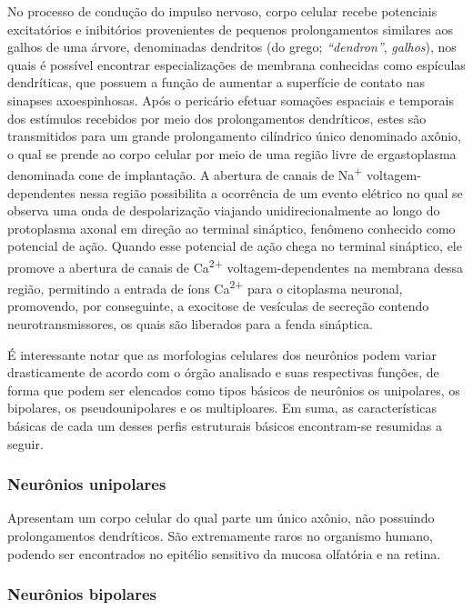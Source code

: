 \documentclass[
]{book}
\theoremstyle{definition}
\theoremstyle{definition}
\theoremstyle{definition}
\theoremstyle{definition}
\theoremstyle{remark}
\begin{document}
No processo de condução do impulso nervoso, corpo celular recebe potenciais excitatórios e inibitórios provenientes de pequenos prolongamentos similares aos galhos de uma árvore, denominadas dendritos (do grego; \emph{``dendron''}, \emph{galhos}), nos quais é possível encontrar especializações de membrana conhecidas como espículas dendríticas, que possuem a função de aumentar a superfície de contato nas sinapses axoespinhosas. Após o pericário efetuar somações espaciais e temporais dos estímulos recebidos por meio dos prolongamentos dendríticos, estes são transmitidos para um grande prolongamento cilíndrico único denominado axônio, o qual se prende ao corpo celular por meio de uma região livre de ergastoplasma denominada cone de implantação. A abertura de canais de Na\textsuperscript{+} voltagem-dependentes nessa região possibilita a ocorrência de um evento elétrico no qual se observa uma onda de despolarização viajando unidirecionalmente ao longo do protoplasma axonal em direção ao terminal sináptico, fenômeno conhecido como potencial de ação. Quando esse potencial de ação chega no terminal sináptico, ele promove a abertura de canais de Ca\textsuperscript{2+} voltagem-dependentes na membrana dessa região, permitindo a entrada de íons Ca\textsuperscript{2+} para o citoplasma neuronal, promovendo, por conseguinte, a exocitose de vesículas de secreção contendo neurotransmissores, os quais são liberados para a fenda sináptica.

É interessante notar que as morfologias celulares dos neurônios podem variar drasticamente de acordo com o órgão analisado e suas respectivas funções, de forma que podem ser elencados como tipos básicos de neurônios os unipolares, os bipolares, os pseudounipolares e os multiploares. Em suma, as características básicas de cada um desses perfis estruturais básicos encontram-se resumidas a seguir.

\hypertarget{neuruxf4nios-unipolares}{%
\subsubsection*{Neurônios unipolares}\label{neuruxf4nios-unipolares}}

Apresentam um corpo celular do qual parte um único axônio, não possuindo prolongamentos dendríticos. São extremamente raros no organismo humano, podendo ser encontrados no epitélio sensitivo da mucosa olfatória e na retina.

\hypertarget{neuruxf4nios-bipolares}{%
\subsubsection*{Neurônios bipolares}\label{neuruxf4nios-bipolares}}
\end{document}

